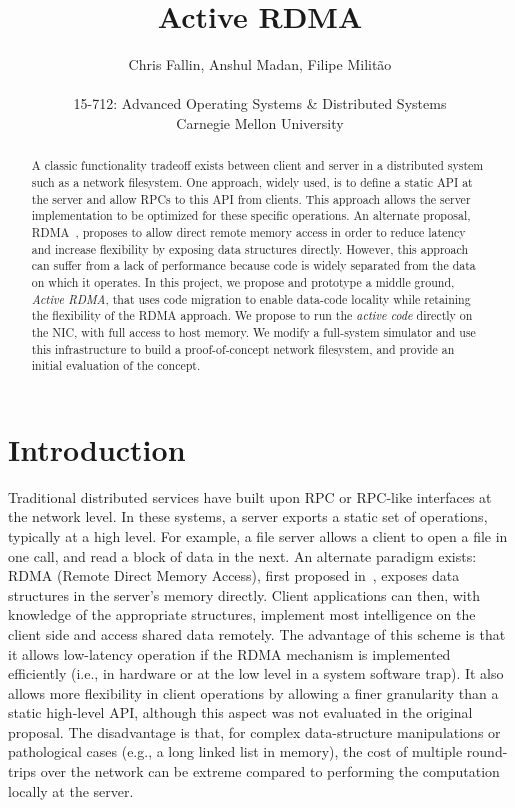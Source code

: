 \documentclass[10pt]{article}
\title{Active RDMA}
\author{Chris Fallin, Anshul Madan, Filipe Milit\~{a}o\\ \\
15-712: Advanced Operating Systems \&  Distributed Systems\\
Carnegie Mellon University}
\date{}
\begin{document}
\maketitle

\begin{abstract}
A classic functionality tradeoff exists between client and server in a
distributed system such as a network filesystem. One approach, widely
used, is to define a static API at the server and allow RPCs to this
API from clients. This approach allows the server implementation to be
optimized for these specific operations. An alternate proposal,
RDMA~\cite{thekkath94}, proposes to allow direct remote memory access
in order to reduce latency and increase flexibility by exposing data
structures directly. However, this approach can suffer from a lack of
performance because code is widely separated from the data on which it
operates. In this project, we propose and prototype a middle ground,
\emph{Active RDMA}, that uses code migration to enable data-code
locality while retaining the flexibility of the RDMA approach. We
propose to run the \emph{active code} directly on the NIC, with full
access to host memory. We modify a full-system simulator and use this
infrastructure to build a proof-of-concept network filesystem, and
provide an initial evaluation of the concept.

\end{abstract}

\section{Introduction}

Traditional distributed services have built upon RPC or RPC-like
interfaces at the network level. In these systems, a server exports a
static set of operations, typically at a high level. For example, a
file server allows a client to open a file in one call, and read a
block of data in the next. An alternate paradigm exists: RDMA (Remote
Direct Memory Access), first proposed in~\cite{thekkath94}, exposes
data structures in the server's memory directly. Client applications
can then, with knowledge of the appropriate structures, implement most
intelligence on the client side and access shared data remotely. The
advantage of this scheme is that it allows low-latency operation if
the RDMA mechanism is implemented efficiently (i.e., in hardware or at
the low level in a system software trap). It also allows more
flexibility in client operations by allowing a finer granularity than
a static high-level API, although this aspect was not evaluated in the
original proposal. The disadvantage is that, for complex
data-structure manipulations or pathological cases (e.g., a long
linked list in memory), the cost of multiple round-trips over the
network can be extreme compared to performing the computation locally
at the server.
\end{document}
